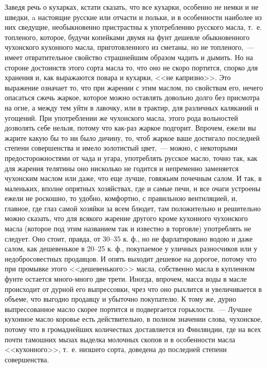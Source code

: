 Заведя речь о кухарках, кстати сказать, что все кухарки, особенно не немки и не шведки, a настоящие русские или отчасти и польки, и в особенности наиболее из них сведущие, необыкновенно пристрастны к употреблению русского масла, т.~е. топленого, которое, будучи копейками двумя на фунт дешевле обыкновенного чухонского кухонного масла, приготовленного из сметаны, но не топленого,~--- имеет отвратительное свойство страшнейшим образом чадить и дымить. Но на стороне достоинств этого сорта масла то, что оно не скоро портится, спорко для хранения и, как выражаются повара и кухарки, <<не капризно>>. Это выражение означает то, что при жарении с этим маслом, по свойствам его, нечего опасаться сжечь жаркое, которое можно оставлять довольно долго без присмотра на огне, а между тем уйти в лавочку, или в трактир, для различных каляканий и угощений. При употреблении же чухонского масла, этого рода вольностей дозволять себе нельзя, потому что как-раз жаркое подгорит. Впрочем, ежели вы жарите какую бы то ни было дичину, то, чтоб жаркое ваше достигало последней степени совершенства и имело золотистый цвет,~--- можно, с некоторыми предосторожностями от чада и угара, употреблять русское масло, точно так, как для жарения телятины оно нисколько не годится и непременно заменяется чухонским маслом или даже, что еще лучше, говяжьим почечным салом. И так, в маленьких, вполне опрятных хозяйствах, где и самые печи, и все очаги устроены ежели не роскошно, то удобно, комфортно, с правильною вентиляцией, и, главное, где глаз самой хозяйки за всем блюдет, там положительно и решительно можно сказать, что для всякого жарение другого кроме кухонного чухонского масла (которое под этим названием так и известно в торговле) употреблять не следует. Оно стоит, правда, от 30–35 к. ф., но не фарлатировано водою и даже салом, как дешевенькое в 20–25 к. ф., покупаемое у уличных разносчиков или у недобросовестных продавцов. И опять выходит дешевое на дорогое, потому что при промывке этого <<дешевенького>> масла, собственно масла в купленном фунте остается много-много две трети. Иногда, впрочем, масса воды в масле происходит от дурной его выпрессовки, чрез что оно рыхлится и увеличивается в объеме, что выгодно продавцу и убыточно покупателю. К тому же, дурно выпрессованное масло скорее портится и подвергается горьклости.~--- Лучшее кухонное масло коровье есть действительно, в полном значении слова, чухонское, потому что в громаднейших количествах доставляется из Финляндии, где на всех почти тамошних мызах выделка молочных скопов и в особенности масла <<кухонного>>, т.~е. низшего сорта, доведена до последней степени совершенства.

